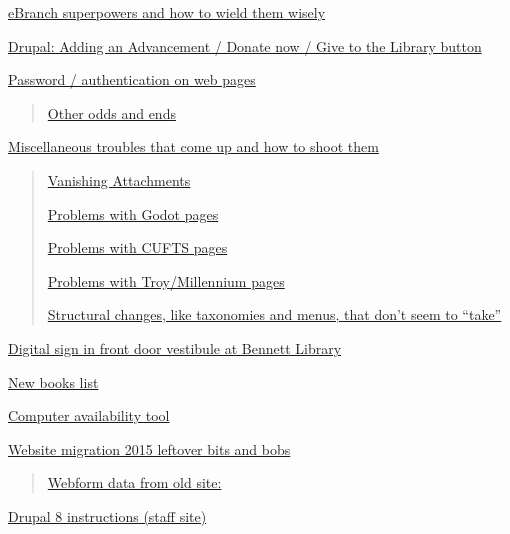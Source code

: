 \documentclass[
  openany]{book}
\begin{document}
\protect\hyperlink{ebranch-superpowers-and-how-to-wield-them-wisely}{eBranch superpowers and how to wield them
wisely}

\protect\hyperlink{drupal-adding-an-advancement-donate-now-give-to-the-library-button}{Drupal: Adding an Advancement / Donate now / Give to the Library
button}

\protect\hyperlink{password-authentication-on-web-pages}{Password / authentication on web
pages}

\begin{quote}
\protect\hyperlink{other-odds-and-ends}{Other odds and ends}
\end{quote}

\protect\hyperlink{miscellaneous-troubles-that-come-up-and-how-to-shoot-them}{Miscellaneous troubles that come up and how to shoot
them}

\begin{quote}
\protect\hyperlink{vanishing-attachments}{Vanishing Attachments}

\protect\hyperlink{problems-with-godot-pages}{Problems with Godot pages}

\protect\hyperlink{problems-with-cufts-pages}{Problems with CUFTS pages}

\protect\hyperlink{problems-with-troymillennium-pages}{Problems with Troy/Millennium
pages}

\protect\hyperlink{structural-changes-like-taxonomies-and-menus-that-dont-seem-to-take}{Structural changes, like taxonomies and menus, that don't seem to
``take''}
\end{quote}

\protect\hyperlink{digital-sign-in-front-door-vestibule-at-bennett-library}{Digital sign in front door vestibule at Bennett
Library}

\protect\hyperlink{new-books-list}{New books list}

\protect\hyperlink{computer-availability-tool}{Computer availability tool}

\protect\hyperlink{website-migration-2015-leftover-bits-and-bobs}{Website migration 2015 leftover bits and
bobs}

\begin{quote}
\protect\hyperlink{webform-data-from-old-site}{Webform data from old site:}
\end{quote}

\protect\hyperlink{drupal-8-instructions-staff-site}{Drupal 8 instructions (staff site)}
\end{document}
